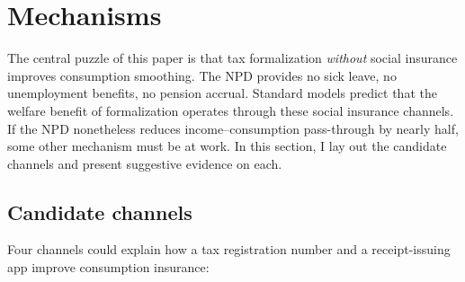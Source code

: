 \documentclass[12pt]{article}
\begin{document}
\section{Mechanisms}
\label{sec:mechanisms}

The central puzzle of this paper is that tax formalization \textit{without} social insurance improves consumption smoothing. The NPD provides no sick leave, no unemployment benefits, no pension accrual. Standard models predict that the welfare benefit of formalization operates through these social insurance channels. If the NPD nonetheless reduces income--consumption pass-through by nearly half, some other mechanism must be at work. In this section, I lay out the candidate channels and present suggestive evidence on each.

\subsection{Candidate channels}

Four channels could explain how a tax registration number and a receipt-issuing app improve consumption insurance:
\end{document}
